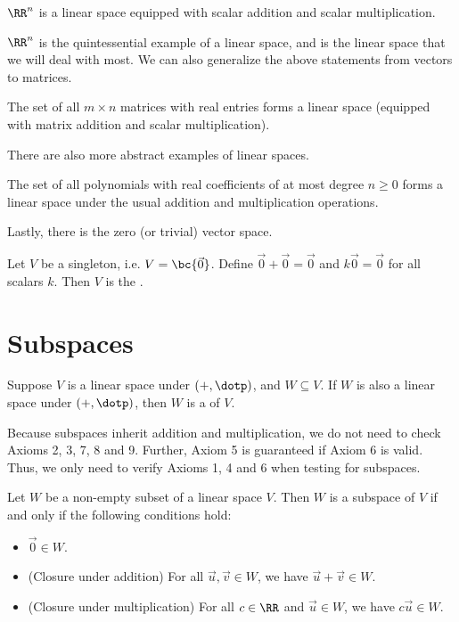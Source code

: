 \begin{proposition}
    $\RR^n$ is a linear space equipped with scalar addition and scalar multiplication.
\end{proposition}

$\RR^n$ is the quintessential example of a linear space, and is the linear space that we will deal with most. We can also generalize the above statements from vectors to matrices.

\begin{proposition}
    The set of all $m \times n$ matrices with real entries forms a linear space (equipped with matrix addition and scalar multiplication).
\end{proposition}

There are also more abstract examples of linear spaces.

\begin{proposition}\label{prop:linear-space-finite-func}
    The set of all polynomials with real coefficients of at most degree $n \geq 0$ forms a linear space under the usual addition and multiplication operations.
\end{proposition}

Lastly, there is the zero (or trivial) vector space.

\begin{definition}
    Let $V$ be a singleton, i.e. $V = \bc{\vec 0}$. Define $\vec 0 + \vec 0 = \vec 0$ and $k \vec 0 = \vec 0$ for all scalars $k$. Then $V$ is the .
\end{definition}

\section{Subspaces}

\begin{definition}
    Suppose $V$ is a linear space under $(+, \dotp)$, and $W \subseteq V$. If $W$ is also a linear space under $(+, \dotp)$, then $W$ is a  of $V$.
\end{definition}

Because subspaces inherit addition and multiplication, we do not need to check Axioms 2, 3, 7, 8 and 9. Further, Axiom 5 is guaranteed if Axiom 6 is valid. Thus, we only need to verify Axioms 1, 4 and 6 when testing for subspaces.

\begin{recipe}
    Let $W$ be a non-empty subset of a linear space $V$. Then $W$ is a subspace of $V$ if and only if the following conditions hold:
    \begin{itemize}
        \item $\vec 0 \in W$.
        \item (Closure under addition) For all $\vec u, \vec v \in W$, we have $\vec u + \vec v \in W$.
        \item (Closure under multiplication) For all $c \in \RR$ and $\vec u \in W$, we have $c \vec u \in W$.
    \end{itemize}
\end{recipe}

